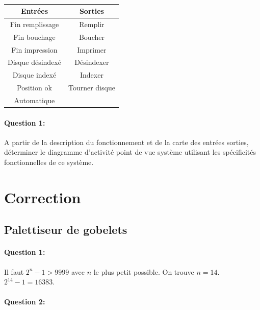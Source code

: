 ~\

\begin{center}
\begin{tabular}{|c|c|}
\hline
\textbf{Entrées} & \textbf{Sorties} \\
\hline
Fin remplissage & Remplir \\
\hline
Fin bouchage & Boucher \\
\hline
Fin impression & Imprimer \\
\hline
Disque désindexé & Désindexer \\
\hline
Disque indexé & Indexer \\
\hline
Position ok & Tourner disque \\
\hline
Automatique & \\
\hline
\end{tabular} 
\end{center}
 
\paragraph{Question 1:} A partir de la description du fonctionnement et de la carte des entrées sorties, déterminer le diagramme d'activité point de vue système utilisant les spécificités fonctionnelles de ce système. 
 

\clearpage

\ifdef{\public}{}{}

\pagestyle{correction}

\newpage

\section{Correction}

\subsection{Palettiseur de gobelets}

\paragraph{Question 1:} Il faut $2^n-1>9999$ avec $n$ le plus petit possible. On trouve $n=14$. $2^{14}-1=16383$.

\paragraph{Question 2:}

